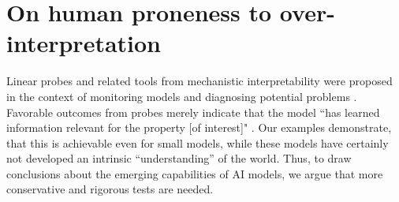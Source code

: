 \documentclass{article}
\theoremstyle{plain}
\theoremstyle{definition}
\theoremstyle{remark}
\begin{document}



\section{On human proneness to over-interpretation}
Linear probes and related tools from mechanistic interpretability were proposed in the context of monitoring models and diagnosing potential problems \citep{alain2018understanding}. Favorable outcomes from probes merely indicate that the model ``has learned information relevant for the property [of interest]" \citep{belinkov2021probing}. Our examples demonstrate, that this is achievable even for small models, while these models have certainly not developed an intrinsic ``understanding'' of the world. Thus, to draw conclusions about the emerging capabilities of AI models, we argue that more conservative and rigorous tests are needed.

\end{document}

